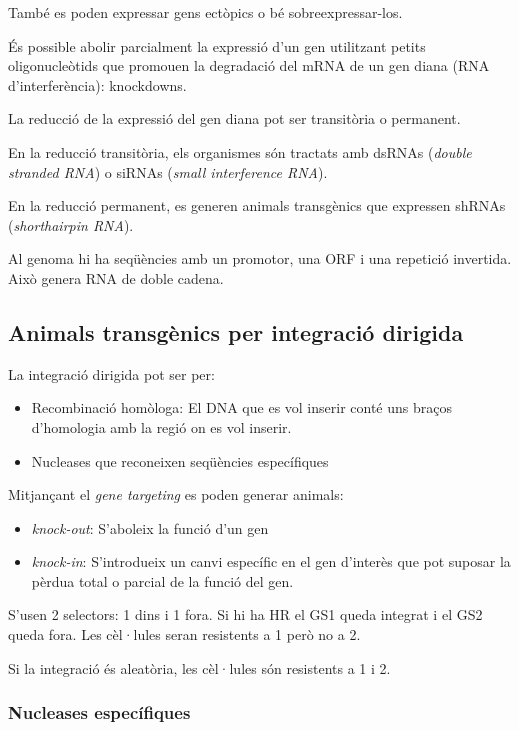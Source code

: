 També es poden expressar gens ectòpics o bé sobreexpressar-los.

És possible abolir parcialment la expressió d'un gen utilitzant petits
oligonucleòtids que promouen la degradació del mRNA de un gen diana
(RNA d'interferència): knockdowns.

La reducció de la expressió del gen diana pot ser transitòria o permanent.

En la reducció transitòria, els organismes són tractats amb dsRNAs
(\textit{double stranded RNA}) o siRNAs (\textit{small interference
  RNA}).

En la reducció permanent, es generen animals transgènics que expressen
shRNAs (\textit{shorthairpin RNA}).

Al genoma hi ha seqüències amb un promotor, una ORF i una repetició
invertida. Això genera RNA de doble cadena.


\subsection{Animals transgènics per integració dirigida}
\label{sec:anim-transg-per-1}
La integració dirigida pot ser per:
\begin{itemize}
\item Recombinació homòloga: El DNA que es vol inserir conté uns
  braços d'homologia amb la regió on es vol inserir.
\item Nucleases que reconeixen seqüències específiques
\end{itemize}

Mitjançant el \textit{gene targeting} es poden generar animals:
\begin{itemize}
\item \textit{knock-out}: S'aboleix la funció d'un gen
\item \textit{knock-in}: S'introdueix un canvi específic en el gen
  d'interès que pot suposar la pèrdua total o parcial de la funció del gen.
\end{itemize}

S'usen 2 selectors: 1 dins i 1 fora. Si hi ha HR el GS1 queda integrat
i el GS2 queda fora. Les cèl·lules seran resistents a 1 però no a 2.

Si la integració és aleatòria, les cèl·lules són resistents a 1 i 2.


\subsubsection{Nucleases específiques}
\label{sec:nucl-espec}

